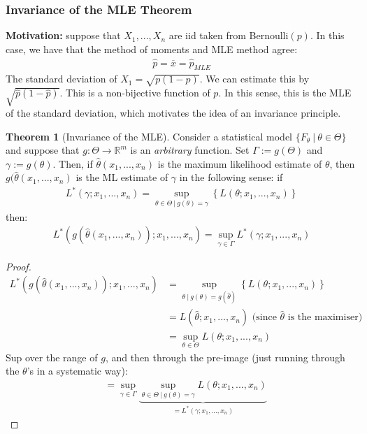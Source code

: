 \documentclass[11pt]{scrartcl}
\newcommand{\R}[0]{\mathbb{R}}
\theoremstyle{definition}
\newtheorem{theorem}{Theorem}
\theoremstyle{remark}
\begin{document}
\subsubsection{Invariance of the MLE Theorem}
\textbf{Motivation:} suppose that $X_1, ..., X_n$ are iid taken from Bernoulli$(p)$. In this case, we have that the method of moments and MLE method agree: 
\begin{align*}
	\hat{p} = \overline{x} = \hat{p}_{MLE} 	
\end{align*}
The standard deviation of $X_1 = \sqrt{ p (1-p)}$. We can estimate this by $\sqrt{\hat{p}(1-\hat{p})}$. This is a non-bijective function of $p$. In this sense, this is the MLE of the standard deviation, which motivates the idea of an invariance principle. 

\begin{theorem}[Invariance of the MLE]
	Consider a statistical model $\{ F_\theta\ |\ \theta \in \Theta \}$ and suppose that $g: \Theta \rightarrow \R^m$ is an \emph{arbitrary} function. Set $\Gamma := g(\Theta)$ and $\gamma := g (\theta)$. Then, if $\hat{\theta}(x_1, ..., x_n)$ is the maximum likelihood estimate of $\theta$, then $g(\hat{\theta}(x_1,..., x_n ) $ is the ML estimate of $\gamma$ in the following sense: if 
	\begin{align}
		L^*(\gamma; x_1, ... , x_n ) = \sup_{\theta \in \Theta\ |\ g(\theta) = \gamma } \left\{ L(\theta; x_1, ..., x_n)	\right\} 
	\end{align}
	then: 
	\begin{align}
		L^*(g(\hat{\theta}(x_1,..., x_n)); x_1,..., x_n) = \sup_{\gamma \in \Gamma} L^*(\gamma; x_1, ..., x_n ) 	
	\end{align}
\end{theorem}

\begin{proof}
	\begin{align*}
	L^*(g(\hat{\theta} (x_1, ..., x_n)); x_1, ..., x_n ) & = \sup_{\theta\ |\ g(\theta) = g (\hat{\theta}) } \left\{ 	L(\theta; x_1, ..., x_n )	\right\} 	\\
		& = L(\hat{\theta}; x_1, ..., x_n ) \text{ (since $\hat{\theta}$ is the maximiser)} \\
		& = \sup_{\theta \in \Theta} L(\theta; x_1, ..., x_n) 
	\end{align*}
	Sup over the range of $g$, and then through the pre-image (just running through the $\theta$'s in a systematic way):
	\begin{align*}
		& = \sup_{\gamma \in \Gamma} \underbrace{\sup_{\theta \in \Theta\ |\ g(\theta) = \gamma } L(\theta; x_1, ..., x_n ) }_{=L^*(\gamma; x_1, ..., x_n)}	
	\end{align*}
\end{proof}
\end{document}
